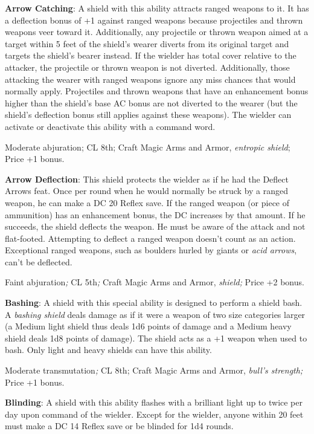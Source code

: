 \textbf{Arrow Catching}: A shield with this ability attracts ranged weapons to it. It has a deflection bonus of +1 against ranged weapons because projectiles and thrown weapons veer toward it. Additionally, any projectile or thrown weapon aimed at a target within 5 feet of the shield's wearer diverts from its original target and targets the shield's bearer instead. If the wielder has total cover relative to the attacker, the projectile or thrown weapon is not diverted. Additionally, those attacking the wearer with ranged weapons ignore any miss chances that would normally apply. Projectiles and thrown weapons that have an enhancement bonus higher than the shield's base AC bonus are not diverted to the wearer (but the shield's deflection bonus still applies against these weapons). The wielder can activate or deactivate this ability with a command word.
				
Moderate abjuration; CL 8th; Craft Magic Arms and Armor, \textit{entropic shield}; Price +1 bonus.
				
\textbf{Arrow Deflection}: This shield protects the wielder as if he had the Deflect Arrows feat. Once per round when he would normally be struck by a ranged weapon, he can make a DC 20 Reflex save. If the ranged weapon (or piece of ammunition) has an enhancement bonus, the DC increases by that amount. If he succeeds, the shield deflects the weapon. He must be aware of the attack and not flat-footed. Attempting to deflect a ranged weapon doesn't count as an action. Exceptional ranged weapons, such as boulders hurled by giants or \textit{acid arrows}, can't be deflected.
				
Faint abjuration\textit{; }CL 5th\textit{; }Craft Magic Arms and Armor, \textit{shield; }Price +2 bonus.
				
\textbf{Bashing}: A shield with this special ability is designed to perform a shield bash. A \textit{bashing shield} deals damage as if it were a weapon of two size categories larger (a Medium light shield thus deals 1d6 points of damage and a Medium heavy shield deals 1d8 points of damage). The shield acts as a +1 weapon when used to bash. Only light and heavy shields can have this ability.
				
Moderate transmutation\textit{; }CL 8th; Craft Magic Arms and Armor, \textit{bull's strength; }Price +1 bonus.
				
\textbf{Blinding}: A shield with this ability flashes with a brilliant light up to twice per day upon command of the wielder. Except for the wielder, anyone within 20 feet must make a DC 14 Reflex save or be blinded for 1d4 rounds.
				
